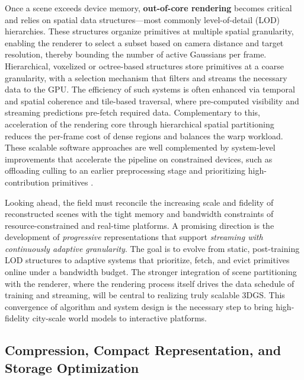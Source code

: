 \documentclass[11pt,a4paper]{article}
\begin{document}
Once a scene exceeds device memory, \textbf{out-of-core rendering} becomes critical and relies on spatial data structures---most commonly level-of-detail (LOD) hierarchies. These structures organize primitives at multiple spatial granularity, enabling the renderer to select a subset based on camera distance and target resolution, thereby bounding the number of active Gaussians per frame. Hierarchical, voxelized or octree-based structures store primitives at a coarse granularity, with a selection mechanism that filters and streams the necessary data to the GPU. The efficiency of such systems is often enhanced via temporal and spatial coherence and tile-based traversal, where pre-computed visibility and streaming predictions pre-fetch required data. \cite{arxiv:2606.00352v1} Complementary to this, acceleration of the rendering core through hierarchical spatial partitioning reduces the per-frame cost of dense regions and balances the warp workload. These scalable software approaches are well complemented by system-level improvements that accelerate the pipeline on constrained devices, such as offloading culling to an earlier preprocessing stage and prioritizing high-contribution primitives \cite{arxiv:2503.05168v3}.

Looking ahead, the field must reconcile the increasing scale and fidelity of reconstructed scenes with the tight memory and bandwidth constraints of resource-constrained and real-time platforms. A promising direction is the development of \emph{progressive} representations that support \emph{streaming with continuously adaptive granularity}. The goal is to evolve from static, post-training LOD structures to adaptive systems that prioritize, fetch, and evict primitives online under a bandwidth budget. The stronger integration of scene partitioning with the renderer, where the rendering process itself drives the data schedule of training and streaming, will be central to realizing truly scalable 3DGS. This convergence of algorithm and system design is the necessary step to bring high-fidelity city-scale world models to interactive platforms.


\subsection{Compression, Compact Representation, and Storage Optimization}
\end{document}
